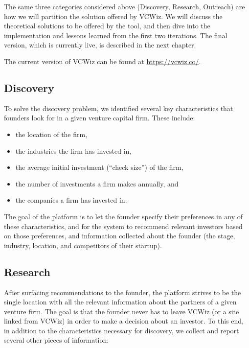 The same three categories considered above (Discovery, Research, Outreach) are how we will partition the solution offered by VCWiz. We will discuss the theoretical solutions to be offered by the tool, and then dive into the implementation and lessons learned from the first two iterations. The final version, which is currently live, is described in the next chapter.

The current version of VCWiz can be found at \url{https://vcwiz.co/}.

\subsection{Discovery}

To solve the discovery problem, we identified several key characteristics that founders look for in a given venture capital firm. These include:

\begin{itemize}
  \item the location of the firm,
  \item the industries the firm has invested in,
  \item the average initial investment (``check size'') of the firm,
  \item the number of investments a firm makes annually, and
  \item the companies a firm has invested in.
\end{itemize}

The goal of the platform is to let the founder specify their preferences in any of these characteristics, and for the system to recommend relevant investors based on those preferences, and information collected about the founder (the stage, industry, location, and competitors of their startup).

\subsection{Research}

After surfacing recommendations to the founder, the platform strives to be the single location with all the relevant information about the partners of a given venture firm. The goal is that the founder never has to leave VCWiz (or a site linked from VCWiz) in order to make a decision about an investor. To this end, in addition to the characteristics necessary for discovery, we collect and report several other pieces of information:

